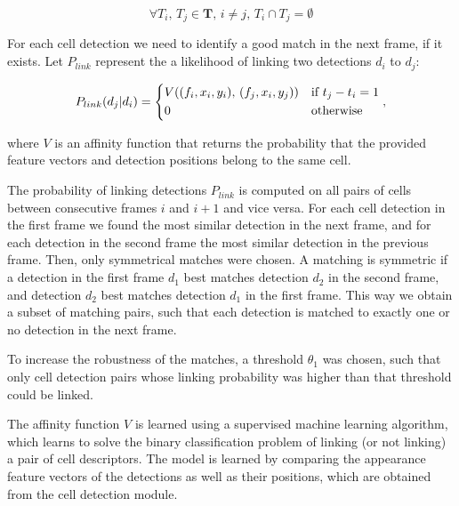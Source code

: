 		\[
			\forall T_i \text{, } T_j \in \textbf{T} \text{, } i \neq j \text{, }  T_i \cap T_j = \emptyset
		\]

		
		For each cell detection we need to identify a good match in the next frame, if it exists. Let $P_{link}$ represent the a likelihood of linking two detections $d_i$ to $d_j$:
		
		\[
			P_{link}(d_j|d_i) = 
			\begin{dcases}
			   V((f_i, x_i, y_i)\text{, } (f_j, x_i, y_j)) & \text{if } t_j - t_i = 1 \\
			   0       & \text{otherwise}
			\end{dcases},
		\]
		
		\noindent where $V$ is an affinity function that returns the probability that the provided feature vectors and detection positions belong to the same cell.

		The probability of linking detections $P_{link}$ is computed on all pairs of cells between consecutive frames $i$ and $i+1$ and vice versa. For each cell detection in the first frame we found the most similar detection in the next frame, and for each detection in the second frame the most similar detection in the previous frame. Then, only symmetrical matches were chosen. A matching is symmetric if a detection in the first frame $d_1$ best matches detection $d_2$ in the second frame, and detection $d_2$ best matches detection $ d_1 $ in the first frame. This way we obtain a subset of matching pairs, such that each detection is matched to exactly one or no detection in the next frame.
		
		To increase the robustness of the matches, a threshold $\theta_1$ was chosen, such that only cell detection pairs whose linking probability was higher than that threshold could be linked.
		
		
		The affinity function $V$ is learned using a supervised machine learning algorithm, which learns to solve the binary classification problem of linking (or not linking) a pair of cell descriptors. The model is learned by comparing the appearance feature vectors of the detections as well as their positions, which are obtained from the cell detection module.

		
